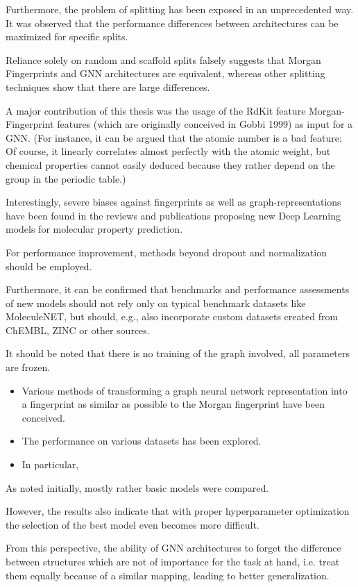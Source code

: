 Furthermore, the problem of splitting has been exposed in an unprecedented way.
It was observed that the performance differences between architectures can be maximized for specific splits.

Reliance solely on random and scaffold splits falsely suggests that Morgan Fingerprints and GNN architectures are equivalent, whereas other splitting techniques show that there are large differences.

A major contribution of this thesis was the usage of the RdKit feature Morgan-Fingerprint features (which are originally conceived in Gobbi 1999) as input for a GNN. 
(For instance, it can be argued that the atomic number is a bad feature: Of course, it linearly correlates almost perfectly with the atomic weight, but chemical properties cannot easily deduced because they rather depend on the group in the periodic table.)

Interestingly, severe biases against fingerprints as well as graph-representations have been found in the reviews and publications proposing new Deep Learning models for molecular property prediction.

For performance improvement, methods beyond dropout and normalization should be employed.


Furthermore, it can be confirmed that benchmarks and performance assessments of new models should not rely only on typical benchmark datasets like MoleculeNET, but should, e.g., also incorporate custom datasets created from ChEMBL, ZINC or other sources.






It should be noted that there is no training of the graph involved, all parameters are frozen.

\begin{itemize}
\item	Various methods of transforming a graph neural network representation into a fingerprint as similar as possible to the Morgan fingerprint have been conceived.
\item	The performance on various datasets has been explored.
\item	In particular,
\end{itemize}



As noted initially, mostly rather basic models were compared.

However, the results also indicate that with proper hyperparameter optimization the selection of the best model even becomes more difficult.



From this perspective, the ability of GNN architectures to forget the difference between structures  which are not of importance for the task at hand, i.e. treat them equally because of a similar mapping, leading to better generalization.